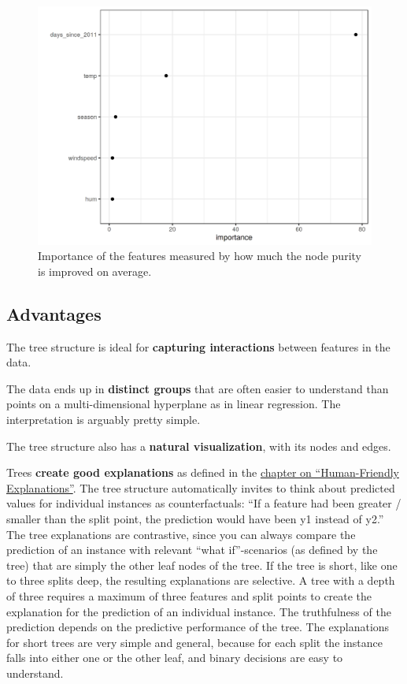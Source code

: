 \documentclass[12pt,]{krantz}
\begin{document}
\begin{figure}

{\centering \includegraphics[width=\textwidth]{images/tree-importance-1} 

}

\caption{Importance of the features measured by how much the node purity is improved on average.}\label{fig:tree-importance}
\end{figure}

\subsection{Advantages}\label{advantages-2}

The tree structure is ideal for \textbf{capturing interactions} between
features in the data.

The data ends up in \textbf{distinct groups} that are often easier to
understand than points on a multi-dimensional hyperplane as in linear
regression. The interpretation is arguably pretty simple.

The tree structure also has a \textbf{natural visualization}, with its
nodes and edges.

Trees \textbf{create good explanations} as defined in the
\protect\hyperlink{good-explanation}{chapter on ``Human-Friendly
Explanations''}. The tree structure automatically invites to think about
predicted values for individual instances as counterfactuals: ``If a
feature had been greater / smaller than the split point, the prediction
would have been y1 instead of y2.'' The tree explanations are
contrastive, since you can always compare the prediction of an instance
with relevant ``what if''-scenarios (as defined by the tree) that are
simply the other leaf nodes of the tree. If the tree is short, like one
to three splits deep, the resulting explanations are selective. A tree
with a depth of three requires a maximum of three features and split
points to create the explanation for the prediction of an individual
instance. The truthfulness of the prediction depends on the predictive
performance of the tree. The explanations for short trees are very
simple and general, because for each split the instance falls into
either one or the other leaf, and binary decisions are easy to
understand.
\end{document}
